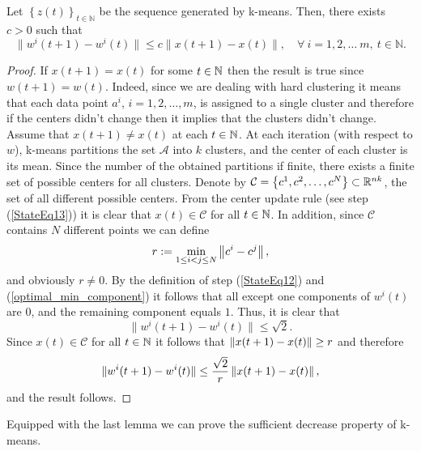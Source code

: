 \begin{lemma} \label{StateLemma_x_bounds_w}
Let $\left\lbrace z(t) \right\rbrace_{t \in \mathbb{N}}$ be the sequence generated by k-means. Then, there exists $c > 0$ such that
\begin{equation*}
	\|w^i(t+1)-w^i(t)\| \leq c \|x(t+1)-x(t)\| , \quad \forall \: i=1,2, \ldots\ m, \: t \in \mathbb{N} .
\end{equation*}
\end{lemma}

\begin{proof}
If $x(t+1)=x(t)$ for some $t \in \mathbb{N}$ then the result is true since $w(t+1)=w(t)$. Indeed, since we are dealing with hard clustering it means that each data point $a^i$, $i=1,2,\ldots,m$, is assigned to a single cluster and therefore if the centers didn't change then it implies that the clusters didn't change. Assume that $x(t+1) \neq x(t)$ at each $t \in \mathbb{N}$. At each iteration (with respect to $w$), k-means partitions the set $\mathcal{A}$ into $k$ clusters, and the center of each cluster is its mean. Since the number of the obtained partitions if finite, there exists a finite set of possible centers for all clusters. Denote by $\mathcal{C} =\left\lbrace c^1,c^2,\ldots,c^N \right\rbrace \subset \mathbb{R}^{nk}$, the set of all different possible centers. From the center update rule (see step (\ref{StateEq13})) it is clear that $x(t)\in \mathcal{C}$ for all $t\in \mathbb{N}$. In addition, since $\mathcal{C}$ contains $N$ different points we can define
\begin{equation*}
	r:=\min\limits_{1 \leq i <j \leq N} \left\Vert {c^i - c^j} \right\Vert,
\end{equation*}
and obviously $r \neq 0$. By the definition of step (\ref{StateEq12})  and (\ref{optimal_min_component}) it follows that all except one components of $w^i(t)$ are $0$, and the remaining component equals $1$.
Thus, it is clear that
\begin{equation*}
	\|w^i(t+1)-w^i(t)\| \leq \sqrt{2}.
\end{equation*}
Since $x(t) \in \mathcal{C}$ for all $t \in \mathbb{N}$ it follows that $\left\Vert {x(t+1)-x(t)} \right\Vert \geq r$ and therefore
\begin{equation*}
	\|w^i(t+1)-w^i(t)\| \leq \frac{\sqrt{2}}{r}\left\Vert {x(t+1)-x(t)} \right\Vert,
\end{equation*}
and the result follows.
\end{proof}

Equipped with the last lemma we can prove the sufficient decrease property of k-means.


